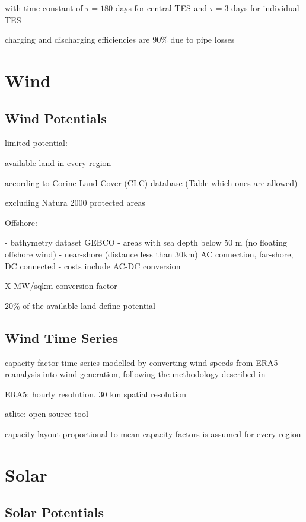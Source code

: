 with time constant of $\tau=180$ days for central TES and $\tau=3$ days for individual TES

charging and discharging efficiencies are 90\% due to pipe losses

\section{Wind}

\subsection{Wind Potentials}

limited potential:

available land in every region

according to Corine Land Cover (CLC) database (Table which ones are allowed)

excluding Natura 2000 protected areas

Offshore:

- bathymetry dataset GEBCO
- areas with sea depth below 50 m (no floating offshore wind)
- near-shore (distance less than 30km) AC connection, far-shore, DC connected
- costs include AC-DC conversion

X MW/sqkm conversion factor

20\% of the available land define potential

\subsection{Wind Time Series}

capacity factor time series modelled by converting wind speeds from ERA5 reanalysis into wind
generation, following the methodology described in

ERA5: hourly resolution, 30 km spatial resolution

atlite: open-source tool

capacity layout proportional to mean capacity factors is assumed for every region

\section{Solar}

\subsection{Solar Potentials}

